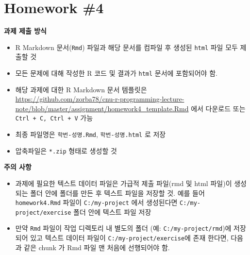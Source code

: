 \documentclass[
  11pt,
]{krantz}
\makeatletter
\newenvironment{Shaded}{\begin{snugshade}}{\end{snugshade}}
\newcommand{\BaseNTok}[1]{\textcolor[rgb]{0.06,0.06,0.06}{#1}}
\providecommand{\tightlist}{%
  \setlength{\itemsep}{0pt}\setlength{\parskip}{0pt}}
\newenvironment{kframe}{%
\medskip{}
\setlength{\fboxsep}{.8em}
 \def\at@end@of@kframe{}%
 \ifinner\ifhmode%
  \def\at@end@of@kframe{\end{minipage}}%
  \begin{minipage}{\columnwidth}%
 \fi\fi%
 \def\FrameCommand##1{\hskip\@totalleftmargin \hskip-\fboxsep
 \colorbox{shadecolor}{##1}\hskip-\fboxsep
     \hskip-\linewidth \hskip-\@totalleftmargin \hskip\columnwidth}%
 \MakeFramed {\advance\hsize-\width
   \@totalleftmargin\z@ \linewidth\hsize
   \@setminipage}}%
 {\par\unskip\endMakeFramed%
 \at@end@of@kframe}
\newenvironment{rmdblock}[1]
  {
  \begin{itemize}
  \renewcommand{\labelitemi}{
    \raisebox{-.7\height}[0pt][0pt]{
      {\setkeys{Gin}{width=3em,keepaspectratio}\texttt{[image: images/\#1]}}
    }
  }
  \setlength{\fboxsep}{1em}
  \begin{kframe}
  \item
  }
  {
  \end{kframe}
  \end{itemize}
  }
\newenvironment{rmdimportant}
  {\begin{rmdblock}{important}}
  {\end{rmdblock}}
\makeatother
\begin{document}
\normalsize

\hypertarget{homework-04}{%
\section{Homework \#4}\label{homework-04}}

\footnotesize

\begin{rmdimportant}
\begin{rmdimportant}

\textbf{과제 제출 방식}

\begin{itemize}
\tightlist
\item
  R Markdown 문서(\texttt{Rmd}) 파일과 해당 문서를 컴파일 후 생성된 \texttt{html} 파일 모두 제출할 것
\item
  모든 문제에 대해 작성한 R 코드 및 결과가 \texttt{html} 문서에 포함되어야 함.
\item
  해당 과제에 대한 R Markdown 문서 템플릿은 \url{https://github.com/zorba78/cnu-r-programming-lecture-note/blob/master/assignment/homework4_template.Rmd} 에서 다운로드 또는 \texttt{Ctrl\ +\ C,\ Ctrl\ +\ V} 가능
\item
  최종 파일명은 \texttt{학번-성명.Rmd}, \texttt{학번-성명.html} 로 저장
\item
  압축파일은 \texttt{*.zip} 형태로 생성할 것
\end{itemize}

\textbf{주의 사항}

\begin{itemize}
\tightlist
\item
  과제에 필요한 텍스트 데이터 파일은 가급적 제출 파일(rmd 및 html 파일)이 생성되는 폴더 안에 폴더를 만든 후 텍스트 파일을 저장할 것. 예를 들어 \texttt{homework4.Rmd} 파일이 \texttt{C:/my-project} 에서 생성된다면 \texttt{C:/my-project/exercise} 폴더 안에 텍스트 파일 저장
\item
  만약 \texttt{Rmd} 파일이 작업 디렉토리 내 별도의 폴더 (예: \texttt{C:/my-project/rmd})에 저장되어 있고 텍스트 데이터 파일이 \texttt{C:/my-project/exercise}에 존재 한다면, 다음과 같은 chunk 가 Rmd 파일 맨 처음에 선행되어야 함.
\end{itemize}

\end{rmdimportant}
\end{rmdimportant}

\normalsize

\begin{Shaded}
\end{Shaded}
\end{document}
